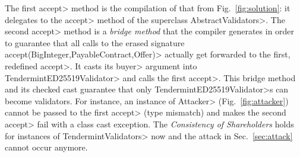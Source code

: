 \noindent
The first \<accept> method is the compilation of that from Fig.~\ref{fig:solution}:
it delegates to the \<accept> method of the superclass \<AbstractValidators>. The second
\<accept> method is a \emph{bridge method} that the compiler generates in order to guarantee
that all calls to the erased signature \<accept(BigInteger,PayableContract,Offer)> actually
get forwarded to the first, redefined \<accept>. It casts its \<buyer> argument
into \<TendermintED25519Validator> and calls the first \<accept>. This
bridge method and its checked cast guarantee that only \<TendermintED25519Validator>s
can become validators. For instance, an instance of \<Attacker> (Fig.~\ref{fig:attacker})
cannot be passed to the first \<accept> (type mismatch) and makes the second \<accept>
fail with a class cast exception. The \emph{Consistency of Shareholders} holds
for instances of \<TendermintValidators> now and the attack in Sec.~\ref{sec:attack} cannot occur
anymore.



